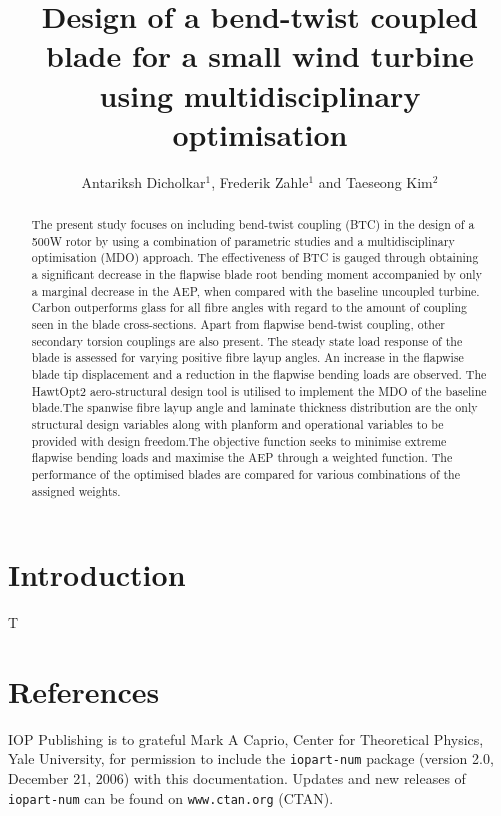 \documentclass[a4paper]{jpconf}
\begin{document}
\title{Design of a bend-twist coupled blade for a small wind turbine using multidisciplinary optimisation}

\author{Antariksh Dicholkar$^1$, Frederik Zahle$^1$ and Taeseong Kim$^2$}

\address{$^1$ DTU Wind Energy, DTU Ris{\o} campus, Frederiksborgvej 399, DK-4000 Roskilde}

\address{$^2$ DTU Wind Energy, Technical University of Denmark, Nils Koppels All{\'e}, Building 403, DK-2800 Kgs. Lyngby }

\begin{abstract}
The present study focuses on including bend-twist coupling (BTC) in the design of a 500W rotor by using a combination of parametric studies and a multidisciplinary optimisation (MDO) approach. The effectiveness of BTC is gauged through obtaining a significant decrease in the flapwise blade root bending moment accompanied by only a marginal decrease in the AEP, when compared with the baseline uncoupled turbine. Carbon outperforms glass for all fibre angles with regard to the amount of coupling seen in the blade cross-sections. Apart from flapwise bend-twist coupling, other secondary torsion couplings are also present. The steady state load response of the blade is assessed for varying positive fibre layup angles. An increase in the flapwise blade tip displacement and a reduction in the flapwise bending loads are observed. The HawtOpt2 aero-structural design tool is utilised to implement the MDO of the baseline blade.The spanwise fibre layup angle and laminate thickness distribution are the only structural design variables along with planform and operational variables to be provided with design freedom.The objective function seeks to minimise extreme flapwise bending loads and maximise the AEP through a weighted function. The performance of the optimised blades are compared for various combinations of the assigned weights.
\end{abstract}
\section{Introduction}
T

\section*{References}
\begin{thebibliography}{9}
 IOP Publishing is to grateful Mark A Caprio, Center for Theoretical Physics, Yale University, for permission to include the {\tt iopart-num} \BibTeX package (version 2.0, December 21, 2006) with  this documentation. Updates and new releases of {\tt iopart-num} can be found on \verb"www.ctan.org" (CTAN). 
\end{thebibliography}
\end{document}
